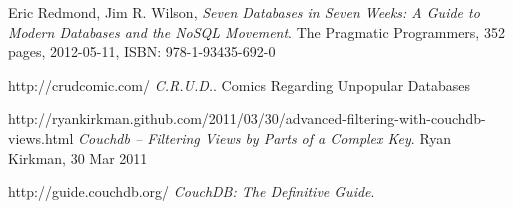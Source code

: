 \renewcommand\bibname{References}

\begin{thebibliography}{9}

  Eric Redmond, Jim R. Wilson,
  \emph{Seven Databases in Seven Weeks: A Guide to Modern Databases and the NoSQL Movement}.
  The Pragmatic Programmers,
  352 pages, 2012-05-11, 
  ISBN: 978-1-93435-692-0
  
  http://crudcomic.com/
  \emph{C.R.U.D.}.
  Comics Regarding Unpopular Databases
  
  http://ryankirkman.github.com/2011/03/30/advanced-filtering-with-couchdb-views.html
  \emph{Couchdb – Filtering Views by Parts of a Complex Key}.
  Ryan Kirkman, 30 Mar 2011

  http://guide.couchdb.org/
  \emph{CouchDB: The Definitive Guide}.  
  

\end{thebibliography}